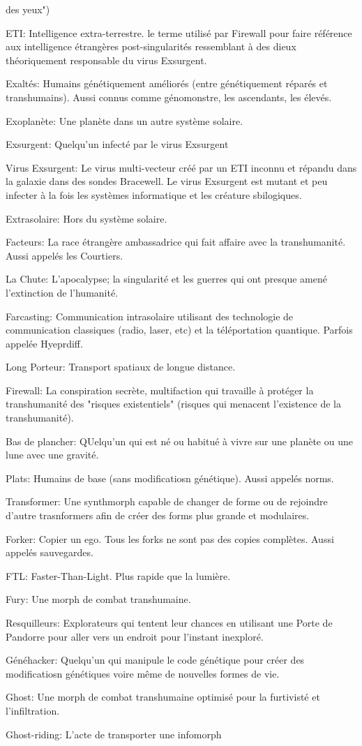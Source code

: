 des yeux") \item ETI: Intelligence extra-terrestre. le terme utilisé par Firewall pour faire référence aux intelligence étrangères post-singularités ressemblant à des dieux théoriquement responsable du virus Exsurgent. \item Exaltés: Humains génétiquement améliorés (entre génétiquement réparés et transhumains). Aussi connus comme génomonstre, les ascendants, les élevés. \item Exoplanète: Une planète dans un autre système solaire. \item Exsurgent: Quelqu'un infecté par le virus Exsurgent \item Virus Exsurgent: Le virus multi-vecteur créé par un ETI inconnu et répandu dans la galaxie dans des sondes Bracewell. Le virus Exsurgent est mutant et peu infecter à la fois les systèmes informatique et les créature sbilogiques. \item Extrasolaire: Hors du système solaire. \item Facteurs: La race étrangère ambassadrice qui fait affaire avec la transhumanité. Aussi appelés les Courtiers. \item La Chute: L'apocalypse; la singularité et les guerres qui ont presque amené l'extinction de l'humanité. \item Farcasting: Communication intrasolaire utilisant des technologie de communication classiques (radio, laser, etc) et la téléportation quantique. Parfois appelée Hyeprdiff. \item Long Porteur: Transport spatiaux de longue distance. \item Firewall: La conspiration secrète, multifaction qui travaille à protéger la transhumanité des "risques existentiels" (risques qui menacent l'existence de la transhumanité). \item Bas de plancher: QUelqu'un qui est né ou habitué à vivre sur une planète ou une lune avec une gravité. \item Plats: Humains de base (sans modificatiosn génétique). Aussi appelés norms. \item Transformer: Une synthmorph capable de changer de forme ou de rejoindre d'autre trasnformers afin de créer des forms plus grande et modulaires. \item Forker: Copier un ego. Tous les forks ne sont pas des copies complètes. Aussi appelés sauvegardes. \item FTL: Faster-Than-Light. Plus rapide que la lumière. \item Fury: Une morph de combat transhumaine. \item Resquilleurs: Explorateurs qui tentent leur chances en utilisant une Porte de Pandorre pour aller vers un endroit pour l'instant inexploré. \item Généhacker: Quelqu'un qui manipule le code génétique pour créer des modificatiosn génétiques voire même de nouvelles formes de vie. \item Ghost: Une morph de combat transhumaine optimisé pour la furtivisté et  l'infiltration. \item Ghost-riding: L'acte de transporter une infomorph 